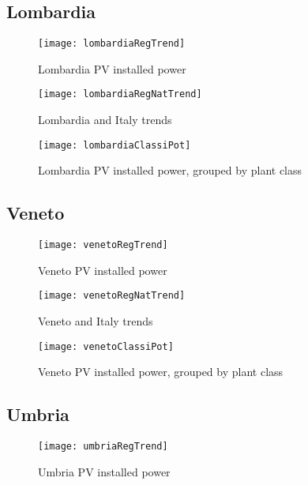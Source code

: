 \documentclass[12pt,a4paper,openright,twoside]{report}
\begin{document}
\subsection*{Lombardia}

\begin{figure}[hp]
	\centering
	\texttt{[image: lombardiaRegTrend]}
	\caption{Lombardia PV installed power}
	\label{lombardiaRegTrend}
\end{figure}

\begin{figure}[hp]
	\centering
	\texttt{[image: lombardiaRegNatTrend]}
	\caption{Lombardia and Italy trends}
	\label{lombardiaRegNatTrend}
\end{figure}

\begin{figure}[hp]
	\centering
	\texttt{[image: lombardiaClassiPot]}
	\caption{Lombardia PV installed power, grouped by plant class}
	\label{lombardiaClassiPot}
\end{figure}

\subsection*{Veneto}

\begin{figure}[hp]
	\centering
	\texttt{[image: venetoRegTrend]}
	\caption{Veneto PV installed power}
	\label{venetoRegTrend}
\end{figure}

\begin{figure}[hp]
	\centering
	\texttt{[image: venetoRegNatTrend]}
	\caption{Veneto and Italy trends}
	\label{venetoRegNatTrend}
\end{figure}

\begin{figure}[hp]
	\centering
	\texttt{[image: venetoClassiPot]}
	\caption{Veneto PV installed power, grouped by plant class}
	\label{venetoClassiPot}
\end{figure}

\subsection*{Umbria}

\begin{figure}[hp]
	\centering
	\texttt{[image: umbriaRegTrend]}
	\caption{Umbria PV installed power}
	\label{umbriaRegTrend}
\end{figure}
\end{document}
